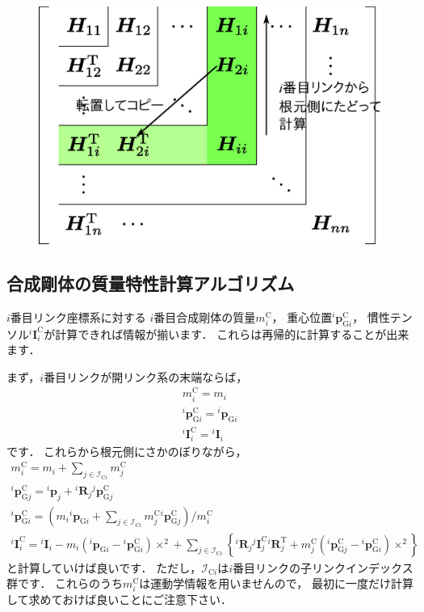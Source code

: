 \documentclass{jsarticle}
\begin{document}
\begin{figure}[h]
\begin{center}
\includegraphics[width=.4\textwidth]{crb_mat_order.eps}
\end{center}
\end{figure}


\subsection{合成剛体の質量特性計算アルゴリズム}

$i$番目リンク座標系に対する
$i$番目合成剛体の質量$m_{i}^{\mathrm{C}}$，
重心位置${}^{i}\bm{p}_{\mathrm{G}i}^{\mathrm{C}}$，
慣性テンソル${}^{i}\bm{I}_{i}^{\mathrm{C}}$が計算できれば情報が揃います．
これらは再帰的に計算することが出来ます．

まず，$i$番目リンクが開リンク系の末端ならば，
\begin{align*}
m_{i}^{\mathrm{C}}=m_{i} \\
{}^{i}\bm{p}_{\mathrm{G}i}^{\mathrm{C}}={}^{i}\bm{p}_{\mathrm{G}i} \\
{}^{i}\bm{I}_{i}^{\mathrm{C}}={}^{i}\bm{I}_{i}
\end{align*}
です．
これらから根元側にさかのぼりながら，
\begin{align*}
m_{i}^{\mathrm{C}}=m_{i}+\sum_{j\in\mathcal{I}_{\mathrm{C}i}}m_{j}^{\mathrm{C}} \\
{}^{i}\bm{p}_{\mathrm{G}j}^{\mathrm{C}}={}^{i}\bm{p}_{j}+{}^{i}\bm{R}_{j}{}^{j}\bm{p}_{\mathrm{G}j}^{\mathrm{C}}
\\
{}^{i}\bm{p}_{\mathrm{G}i}^{\mathrm{C}}=
\left(
m_{i}{}^{i}\bm{p}_{\mathrm{G}i}+
\sum_{j\in\mathcal{I}_{\mathrm{C}i}}m_{j}^{\mathrm{C}}{}^{i}\bm{p}_{\mathrm{G}j}^{\mathrm{C}}
\right)\Big/
m_{i}^{\mathrm{C}}
 \\
{}^{i}\bm{I}_{i}^{\mathrm{C}}={}^{i}\bm{I}_{i}-m_{i}({}^{i}\bm{p}_{\mathrm{G}i}-{}^{i}\bm{p}_{\mathrm{G}i}^{\mathrm{C}})\times^{2}+
\sum_{j\in\mathcal{I}_{\mathrm{C}i}}\left\{
{}^{i}\bm{R}_{j}{}^{j}\bm{I}_{j}^{\mathrm{C}}{}^{i}\bm{R}_{j}^{\mathrm{T}}+
m_{j}^{\mathrm{C}}
({}^{i}\bm{p}_{\mathrm{G}j}^{\mathrm{C}}-{}^{i}\bm{p}_{\mathrm{G}i}^{\mathrm{C}})\times^{2}
\right\}
\end{align*}
と計算していけば良いです．
ただし，$\mathcal{I}_{\mathrm{C}i}$は$i$番目リンクの子リンクインデックス群です．
これらのうち$m_{i}^{\mathrm{C}}$は運動学情報を用いませんので，
最初に一度だけ計算して求めておけば良いことにご注意下さい．
\end{document}
